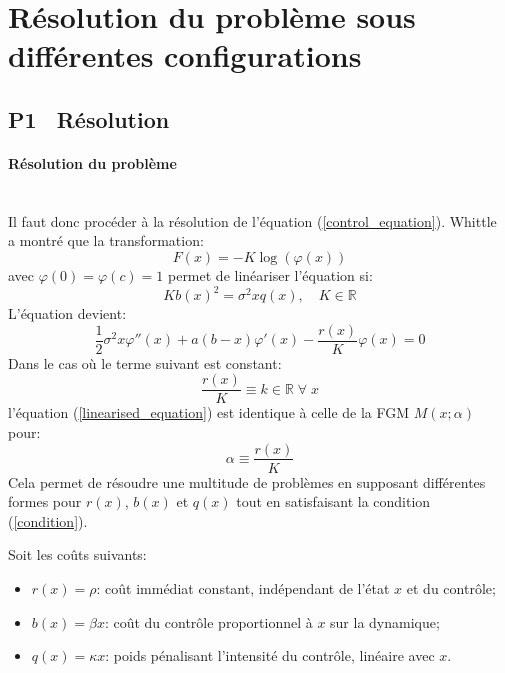 \section{Résolution du problème sous différentes configurations}
\subsection{P1 \textemdash~Résolution}\label{p1}
\paragraph{Résolution du problème}\phantom{}\\
Il faut donc procéder à la résolution de l'équation (\ref{control_equation}). Whittle~\cite{whittle1982} a montré que la transformation: 
\[F(x)=-K\log(\varphi(x))\]
avec $\varphi(0)=\varphi(c)=1$ permet de linéariser l'équation si:
\[
K{b(x)}^2=\sigma^2xq(x),\quad K\in\mathds{R}
\]
L'équation devient:
\begin{equation}\label{linearised_equation}
    \frac{1}{2}\sigma^2 x\varphi''(x) + a(b - x)\varphi'(x) - \frac{r(x)}{K}\varphi(x) = 0
\end{equation}
Dans le cas où le terme suivant est constant:
\begin{equation}\label{condition}
    \frac{r(x)}{K}\equiv k\in\mathds{R}\;\forall\;x
\end{equation}
l'équation (\ref{linearised_equation}) est identique à celle de la \acl{FGM} $M(x;\alpha)$ pour:
\[
\alpha\equiv\frac{r(x)}{K}
\]
Cela permet de résoudre une multitude de problèmes en supposant différentes formes pour $r(x)$, $b(x)$ et $q(x)$ tout en satisfaisant la condition (\ref{condition}). 

Soit les coûts suivants:
\begin{itemize}
    \item $r(x) = \rho$: coût immédiat constant, indépendant de l'état $x$ et du contrôle;
    \item $b(x) = \beta x$: coût du contrôle proportionnel à $x$ sur la dynamique;
    \item $q(x) = \kappa x$: poids pénalisant l'intensité du contrôle, linéaire avec $x$.
\end{itemize}

